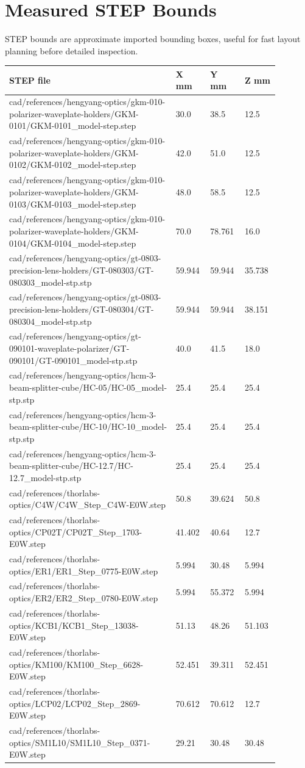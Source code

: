\documentclass[10pt]{article}
\begin{document}
\section{Measured STEP Bounds}
STEP bounds are approximate imported bounding boxes, useful for fast layout planning before detailed inspection.
\begin{longtable}{p{0.58\linewidth}p{0.10\linewidth}p{0.10\linewidth}p{0.10\linewidth}}
\textbf{STEP file} & \textbf{X mm} & \textbf{Y mm} & \textbf{Z mm} \\ \hline
cad/references/hengyang-optics/gkm-010-polarizer-waveplate-holders/GKM-0101/GKM-0101\_model-step.step & 30.0 & 38.5 & 12.5 \\
cad/references/hengyang-optics/gkm-010-polarizer-waveplate-holders/GKM-0102/GKM-0102\_model-step.step & 42.0 & 51.0 & 12.5 \\
cad/references/hengyang-optics/gkm-010-polarizer-waveplate-holders/GKM-0103/GKM-0103\_model-step.step & 48.0 & 58.5 & 12.5 \\
cad/references/hengyang-optics/gkm-010-polarizer-waveplate-holders/GKM-0104/GKM-0104\_model-step.step & 70.0 & 78.761 & 16.0 \\
cad/references/hengyang-optics/gt-0803-precision-lens-holders/GT-080303/GT-080303\_model-stp.stp & 59.944 & 59.944 & 35.738 \\
cad/references/hengyang-optics/gt-0803-precision-lens-holders/GT-080304/GT-080304\_model-stp.stp & 59.944 & 59.944 & 38.151 \\
cad/references/hengyang-optics/gt-090101-waveplate-polarizer/GT-090101/GT-090101\_model-stp.stp & 40.0 & 41.5 & 18.0 \\
cad/references/hengyang-optics/hcm-3-beam-splitter-cube/HC-05/HC-05\_model-stp.stp & 25.4 & 25.4 & 25.4 \\
cad/references/hengyang-optics/hcm-3-beam-splitter-cube/HC-10/HC-10\_model-stp.stp & 25.4 & 25.4 & 25.4 \\
cad/references/hengyang-optics/hcm-3-beam-splitter-cube/HC-12.7/HC-12.7\_model-stp.stp & 25.4 & 25.4 & 25.4 \\
cad/references/thorlabs-optics/C4W/C4W\_Step\_C4W-E0W.step & 50.8 & 39.624 & 50.8 \\
cad/references/thorlabs-optics/CP02T/CP02T\_Step\_1703-E0W.step & 41.402 & 40.64 & 12.7 \\
cad/references/thorlabs-optics/ER1/ER1\_Step\_0775-E0W.step & 5.994 & 30.48 & 5.994 \\
cad/references/thorlabs-optics/ER2/ER2\_Step\_0780-E0W.step & 5.994 & 55.372 & 5.994 \\
cad/references/thorlabs-optics/KCB1/KCB1\_Step\_13038-E0W.step & 51.13 & 48.26 & 51.103 \\
cad/references/thorlabs-optics/KM100/KM100\_Step\_6628-E0W.step & 52.451 & 39.311 & 52.451 \\
cad/references/thorlabs-optics/LCP02/LCP02\_Step\_2869-E0W.step & 70.612 & 70.612 & 12.7 \\
cad/references/thorlabs-optics/SM1L10/SM1L10\_Step\_0371-E0W.step & 29.21 & 30.48 & 30.48 \\
\end{longtable}
\end{document}
